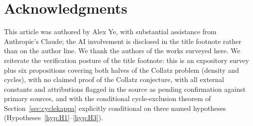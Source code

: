 \documentclass[11pt]{amsart}
\theoremstyle{definition}
\theoremstyle{remark}
\begin{document}
\section*{Acknowledgments}
This article was authored by Alex Ye, with substantial assistance from Anthropic's Claude; the AI
involvement is disclosed in the title footnote rather than on the author line. We thank the authors
of the works surveyed here. We reiterate the verification posture of the title footnote: this is
an expository survey plus six propositions covering both halves of the Collatz problem (density
and cycles), with no claimed proof of the Collatz conjecture, with all external constants and
attributions flagged in the source as pending confirmation against primary sources, and with the
conditional cycle-exclusion theorem of Section~\ref{sec:cyclekappa} explicitly conditional on
three named hypotheses (Hypotheses~\ref{hyp:H1}--\ref{hyp:H3}).



\end{document}
